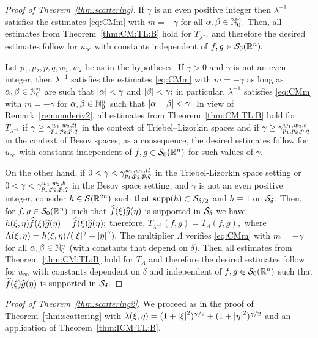 \begin{proof}[Proof of Theorem~\ref{thm:scattering}]
If $\gamma$ is an even positive integer then $\lambda^{-1}$ satisfies the estimates \eqref{eq:CMm} with $m=-\gamma$ for all $\alpha,\beta\in\mathbb{N}_0^n.$ Then,  all estimates from Theorem~\ref{thm:CM:TL:B} hold for $T_{\lambda^{-1}}$  and therefore the desired estimates follow for $u_\infty$ with constants independent of $f,g\in{\mathcal{S}_0}({{\mathbb R}^n}).$ 

Let $p_1,p_2,p,q, w_1,w_2$ be as in the hypotheses.  If $\gamma>0$ and $\gamma$ is not an even integer, then $\lambda^{-1}$ satisfies the estimates \eqref{eq:CMm} with $m=-\gamma$ as long as  $\alpha,\beta\in\mathbb{N}_0^n$ are such that $\left\vert \alpha \right\vert<\gamma$ and $\left\vert \beta \right\vert<\gamma;$ in particular, $\lambda^{-1}$ satisfies \eqref{eq:CMm} with $m=-\gamma$ for $\alpha,\beta\in \mathbb{N}_0^n$ such that $\left\vert \alpha+\beta \right\vert<\gamma.$
In view of Remark~\ref{re:numderiv2}, all estimates from Theorem~\ref{thm:CM:TL:B} hold for $T_{\lambda^{-1}}$ if $\gamma\ge \gamma_{p_1,p_2,p,q}^{w_1,w_2, tl}$ in the context of Triebel--Lizorkin spaces and if $\gamma\ge \gamma_{p_1,p_2,p,q}^{w_1,w_2,b}$ in the context of Besov spaces; as a consequence, the desired estimates follow for $u_\infty$ with constants independent of $f,g\in{\mathcal{S}_0}({{\mathbb R}^n})$ for such values of $\gamma.$


On the other hand, if $0<\gamma<\gamma_{p_1,p_2,p,q}^{w_1,w_2, tl}$ in the Triebel-Lizorkin space setting or $0<\gamma<\gamma_{p_1,p_2,p,q}^{w_1,w_2,b}$ in the Besov space setting, and $\gamma$ is not an even positive integer, consider  $h\in\mathcal{S}(\mathbb{R}^{2n}) $ such that ${\rm{supp}}(h)\subset \mathcal{S}_{\delta/2}$ and $h\equiv 1$ on $\mathcal{S}_{\delta}.$ Then, for $f,g\in {\mathcal{S}_0}({{\mathbb R}^n})$ such that $\widehat{f}(\xi)\widehat{g}(\eta)$ is supported in $\mathcal{S}_{\delta}$ we have $h(\xi,\eta)\widehat{f}(\xi)\widehat{g}(\eta)=\widehat{f}(\xi)\widehat{g}(\eta);$   therefore, $T_{\lambda^{-1}}(f,g)=T_{\Lambda}(f,g),$ where
$\Lambda(\xi,\eta)=h(\xi,\eta)/(\left\vert \xi \right\vert^\gamma+\left\vert \eta \right\vert^\gamma).$ The multiplier $\Lambda$ verifies  \eqref{eq:CMm} with $m=-\gamma$  for all $\alpha,\beta\in\mathbb{N}_0^n$ (with constants that depend on $\delta$). Then all estimates from Theorem~\ref{thm:CM:TL:B} hold for $T_\Lambda$ and therefore the desired estimates follow for $u_\infty$ with constants dependent on $\delta$ and independent of $f,g\in{\mathcal{S}_0}({{\mathbb R}^n})$ such that  $\widehat{f}(\xi)\widehat{g}(\eta)$ is supported in $\mathcal{S}_{\delta}.$
\end{proof}

\begin{proof}[Proof of Theorem~\ref{thm:scattering2}] We proceed as in the proof of Theorem~\ref{thm:scattering} with $\lambda(\xi,\eta)=(1+\left\vert \xi \right\vert^2)^{\gamma /2}+(1+\left\vert \eta \right\vert^2)^{\gamma /2}$ and an application of  Theorem~\ref{thm:ICM:TL:B}.  
\end{proof}  